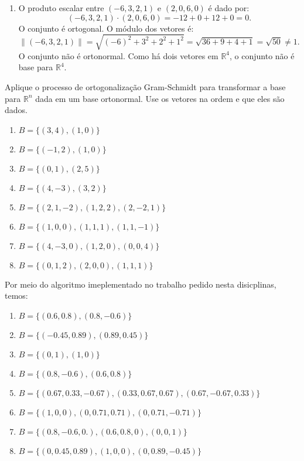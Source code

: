 \begin{resolution}
\begin{enumerate}[label=\alph*)]
    \item O produto escalar entre \((-6, 3, 2, 1)\) e \((2, 0, 6, 0)\) é dado por:
          \[
            (-6, 3, 2, 1) \cdot (2, 0, 6, 0) = -12 + 0 + 12 + 0 = 0.
          \]
          O conjunto é ortogonal. O módulo dos vetores é:
          \[
            \|(-6, 3, 2, 1)\| = \sqrt{(-6)^2 + 3^2 + 2^2 + 1^2} = \sqrt{36 + 9 + 4 + 1} = \sqrt{50} \neq 1.
          \]
          O conjunto não é ortonormal. Como há dois vetores em \(\mathbb{R}^4\), o conjunto não é base para \(\mathbb{R}^4\).
  \end{enumerate}
\end{resolution}

\begin{question}
  Aplique o processo de ortogonalização Gram-Schmidt para transformar a base para $\mathbb{R}^{n}$ dada em um base ortonormal. Use os vetores na ordem e que eles são dados.
  \vspace{-12pt}
  \begin{multicols}{2}
    \begin{enumerate}[label=\alph*)]
      \item $B = \{(3, 4), (1, 0)\}$
      \item $B = \{(-1, 2), (1, 0)\}$
      \item $B = \{(0, 1), (2, 5)\}$
      \item $B = \{(4, -3), (3, 2)\}$
      \item $B = \{(2, 1, -2), (1, 2, 2), (2, -2, 1)\}$
      \item $B = \{(1, 0, 0), (1, 1, 1), (1, 1, -1)\}$
      \item $B = \{(4, -3,0), (1, 2, 0), (0, 0, 4)\}$
      \item $B = \{(0, 1, 2), (2, 0, 0), (1, 1, 1)\}$
    \end{enumerate}
  \end{multicols}
\end{question}

\begin{resolution}
  Por meio do algoritmo imeplementado no trabalho pedido nesta disicplinas, temos:
  \begin{enumerate}[label=\alph*)]
    \item $B = \{(0.6, 0.8), (0.8, -0.6)\}$
    \item $B = \{(-0.45, 0.89), (0.89, 0.45)\}$
    \item $B = \{(0, 1), (1, 0)\}$
    \item $B = \{(0.8, -0.6), (0.6, 0.8)\}$
    \item $B = \{(0.67, 0.33, -0.67), (0.33, 0.67, 0.67), (0.67, -0.67, 0.33)\}$
    \item $B = \{(1, 0, 0), (0, 0.71, 0.71), (0, 0.71, -0.71)\}$
    \item $B = \{(0.8, -0.6, 0.), (0.6, 0.8, 0), (0, 0, 1)\}$
    \item $B = \{(0, 0.45, 0.89), (1, 0, 0), (0, 0.89, -0.45)\}$
  \end{enumerate}
\end{resolution}

